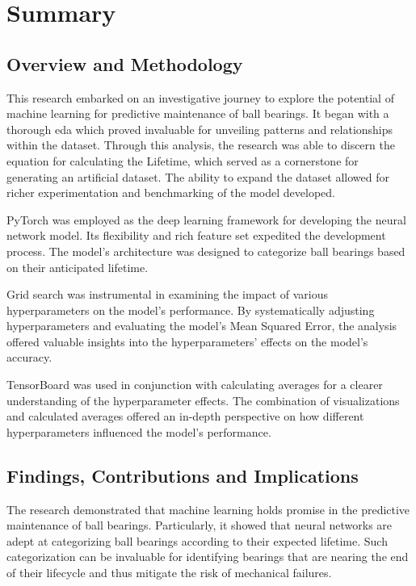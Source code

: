 \chapter{Summary}
\label{sec:diskussion}

\section{Overview and Methodology}
This research embarked on an investigative journey to explore the potential of machine learning for predictive maintenance of ball bearings. It began with a thorough \ac{eda} which proved invaluable for unveiling patterns and relationships within the dataset. Through this analysis, the research was able to discern the equation for calculating the Lifetime, which served as a cornerstone for generating an artificial dataset. The ability to expand the dataset allowed for richer experimentation and benchmarking of the model developed.

PyTorch was employed as the deep learning framework for developing the neural network model. Its flexibility and rich feature set expedited the development process. The model's architecture was designed to categorize ball bearings based on their anticipated lifetime.

Grid search was instrumental in examining the impact of various hyperparameters on the model's performance. By systematically adjusting hyperparameters and evaluating the model's Mean Squared Error, the analysis offered valuable insights into the hyperparameters' effects on the model's accuracy.

TensorBoard was used in conjunction with calculating averages for a clearer understanding of the hyperparameter effects. The combination of visualizations and calculated averages offered an in-depth perspective on how different hyperparameters influenced the model's performance.

\section{Findings, Contributions and Implications}
The research demonstrated that machine learning holds promise in the predictive maintenance of ball bearings. Particularly, it showed that neural networks are adept at categorizing ball bearings according to their expected lifetime. Such categorization can be invaluable for identifying bearings that are nearing the end of their lifecycle and thus mitigate the risk of mechanical failures.

